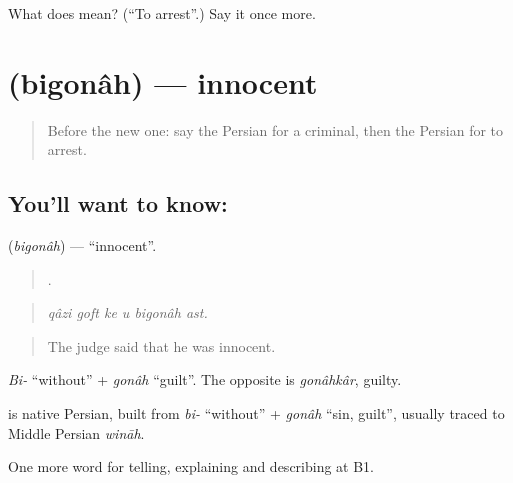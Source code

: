 \begin{tcolorbox}[breakable,colback=teal!4,colframe=teal!35!black,title={Before you move on}]
What does   mean? (\textquotedblleft{}To arrest\textquotedblright{}.) Say it once more.
\end{tcolorbox}
\section[\texorpdfstring{\fa{بی} \fa{گناه} (bigonâh)}{بی گناه (bigonâh)}]{  (bigonâh) — innocent}

\label{lesson:FA-C407-bigonah}



\begin{quote}
Before the new one: say the Persian for a criminal, then the Persian for to arrest.
\end{quote}

\subsection*{You'll want to know:  }
\textbf{ } (\emph{bigonâh}) — \textquotedblleft{}innocent\textquotedblright{}.

\begin{quote}
      .
\end{quote}

\begin{quote}
\emph{qâzi goft ke u bigonâh ast.}
\end{quote}

\begin{quote}
The judge said that he was innocent.
\end{quote}

\emph{Bi-} \textquotedblleft{}without\textquotedblright{} + \emph{gonâh} \textquotedblleft{}guilt\textquotedblright{}. The opposite is \emph{gonâhkâr}, guilty.

\begin{cousinweb}
\textbf{ } is native Persian, built from \emph{bi-} \textquotedblleft{}without\textquotedblright{} + \emph{gonâh} \textquotedblleft{}sin, guilt\textquotedblright{}, usually traced to Middle Persian \emph{wināh}.
\end{cousinweb}

\begin{grammarlens}[title={What you've built}]
One more word for telling, explaining and describing at B1.
\end{grammarlens}

